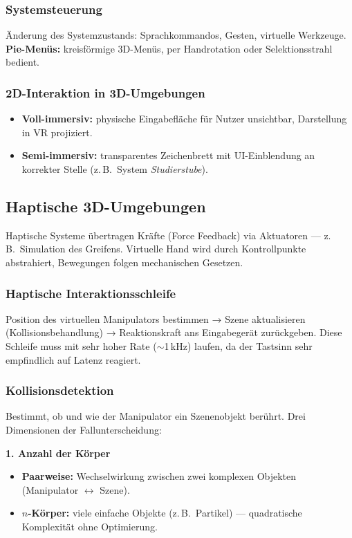 \documentclass[12pt, a4paper]{article}
\begin{document}
\subsubsection*{Systemsteuerung}
Änderung des Systemzustands: Sprachkommandos, Gesten, virtuelle Werkzeuge. \textbf{Pie-Menüs:} kreisförmige 3D-Menüs, per Handrotation oder Selektionsstrahl bedient.

\subsubsection*{2D-Interaktion in 3D-Umgebungen}
\begin{itemize}
  \item \textbf{Voll-immersiv:} physische Eingabefläche für Nutzer unsichtbar, Darstellung in VR projiziert.
  \item \textbf{Semi-immersiv:} transparentes Zeichenbrett mit UI-Einblendung an korrekter Stelle (z.\,B.\ System \textit{Studierstube}).
\end{itemize}

\subsection{Haptische 3D-Umgebungen}

Haptische Systeme übertragen Kräfte (Force Feedback) via Aktuatoren — z.\,B.\ Simulation des Greifens. Virtuelle Hand wird durch Kontrollpunkte abstrahiert, Bewegungen folgen mechanischen Gesetzen.

\subsubsection*{Haptische Interaktionsschleife}

Position des virtuellen Manipulators bestimmen → Szene aktualisieren (Kollisionsbehandlung) → Reaktionskraft ans Eingabegerät zurückgeben. Diese Schleife muss mit sehr hoher Rate ($\sim$1\,kHz) laufen, da der Tastsinn sehr empfindlich auf Latenz reagiert.

\subsubsection*{Kollisionsdetektion}

Bestimmt, ob und wie der Manipulator ein Szenenobjekt berührt. Drei Dimensionen der Fallunterscheidung:

\textbf{1. Anzahl der Körper}
\begin{itemize}
  \item \textbf{Paarweise:} Wechselwirkung zwischen zwei komplexen Objekten (Manipulator $\leftrightarrow$ Szene).
  \item \textbf{$n$-Körper:} viele einfache Objekte (z.\,B.\ Partikel) — quadratische Komplexität ohne Optimierung.
\end{itemize}
\end{document}
